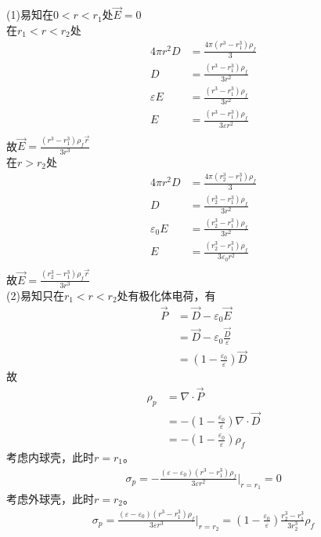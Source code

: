 \documentclass{phyasgn}
\begin{document}
\begin{sol}[1]
  (1)易知在$0<r<r_1$处$\vec{E}=0$\\
  在$r_1<r<r_2$处
  \begin{align*}
    4\pi r^2 D&=\frac{4\pi(r^3-r_1^3)\rho_f}{3}\\
    D&=\frac{(r^3-r_1^3)\rho_f}{3r^2}\\
    \varepsilon E&=\frac{(r^3-r_1^3)\rho_f}{3r^2}\\
    E&=\frac{(r^3-r_1^3)\rho_f}{3\varepsilon r^2}\\
  \end{align*}
  故$\vec{E}=\frac{(r^3-r_1^3)\rho_f\vec{r}}{3r^3}$\\
  在$r>r_2$处
  \begin{align*}
    4\pi r^2 D&=\frac{4\pi(r_2^3-r_1^3)\rho_f}{3}\\
    D&=\frac{(r_2^3-r_1^3)\rho_f}{3r^2}\\
    \varepsilon_0 E&=\frac{(r_2^3-r_1^3)\rho_f}{3r^2}\\
    E&=\frac{(r_2^3-r_1^3)\rho_f}{3\varepsilon_0r^2}\\
  \end{align*}
  故$\vec{E}=\frac{(r_2^3-r_1^3)\rho_f\vec{r}}{3r^3}$\\
  (2)易知只在$r_1<r<r_2$处有极化体电荷，有
  \begin{align*}
    \vec{P}&=\vec{D}-\varepsilon_0\vec{E}\\
    &=\vec{D}-\varepsilon_0\frac{\vec{D}}{\varepsilon}\\
    &=(1-\frac{\varepsilon_0}{\varepsilon})\vec{D}
  \end{align*}
  故
  \begin{align*}
    \rho_p&=\nabla\cdot\vec{P}\\
    &=-(1-\frac{\varepsilon_0}{\varepsilon})\nabla\cdot\vec{D}\\
    &=-(1-\frac{\varepsilon_0}{\varepsilon})\rho_f
  \end{align*}
  考虑内球壳，此时$r=r_1$。
  \begin{align*}
    \sigma_p=-\frac{(\varepsilon-\varepsilon_0)(r^3-r_1^3)\rho_f}{3\varepsilon r^2}|_{r=r_1}=0
  \end{align*}
  考虑外球壳，此时$r=r_2$。
  \begin{align*}
    \sigma_p=\frac{(\varepsilon-\varepsilon_0)(r^3-r_1^3)\rho_f}{3\varepsilon r^3}|_{r=r_2}=(1-\frac{\varepsilon_0}{\varepsilon})\frac{r_2^3-r_1^3}{3r^3_2}\rho_f
  \end{align*}
\end{sol}\par
\end{document}
